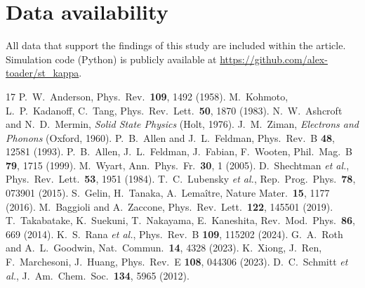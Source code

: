 \documentclass[12pt]{article}
\begin{document}
\section*{Data availability}
All data that support the findings of this study are included within
the article. Simulation code (Python) is publicly available at
\url{https://github.com/alex-toader/st_kappa}.

\begin{thebibliography}{17}
 P.~W.~Anderson, Phys.\ Rev.\ \textbf{109}, 1492 (1958).
 M.~Kohmoto, L.~P.~Kadanoff, C.~Tang, Phys.\ Rev.\ Lett.\ \textbf{50}, 1870 (1983).
 N.~W.~Ashcroft and N.~D.~Mermin, \emph{Solid State Physics} (Holt, 1976).
 J.~M.~Ziman, \emph{Electrons and Phonons} (Oxford, 1960).
 P.~B.~Allen and J.~L.~Feldman, Phys.\ Rev.\ B \textbf{48}, 12581 (1993).
 P.~B.~Allen, J.~L.~Feldman, J.~Fabian, F.~Wooten, Phil.\ Mag.\ B \textbf{79}, 1715 (1999).
 M.~Wyart, Ann.\ Phys.\ Fr.\ \textbf{30}, 1 (2005).
 D.~Shechtman \emph{et al.}, Phys.\ Rev.\ Lett.\ \textbf{53}, 1951 (1984).
 T.~C.~Lubensky \emph{et al.}, Rep.\ Prog.\ Phys.\ \textbf{78}, 073901 (2015).
 S.~Gelin, H.~Tanaka, A.~Lema\^itre, Nature Mater.\ \textbf{15}, 1177 (2016).
 M.~Baggioli and A.~Zaccone, Phys.\ Rev.\ Lett.\ \textbf{122}, 145501 (2019).
 T.~Takabatake, K.~Suekuni, T.~Nakayama, E.~Kaneshita, Rev.\ Mod.\ Phys.\ \textbf{86}, 669 (2014).
 K.~S.~Rana \emph{et al.}, Phys.\ Rev.\ B \textbf{109}, 115202 (2024).
 G.~A.~Roth and A.~L.~Goodwin, Nat.\ Commun.\ \textbf{14}, 4328 (2023).
 K.~Xiong, J.~Ren, F.~Marchesoni, J.~Huang, Phys.\ Rev.\ E \textbf{108}, 044306 (2023).
 D.~C.~Schmitt \emph{et al.}, J.\ Am.\ Chem.\ Soc.\ \textbf{134}, 5965 (2012).
\end{thebibliography}
\end{document}
